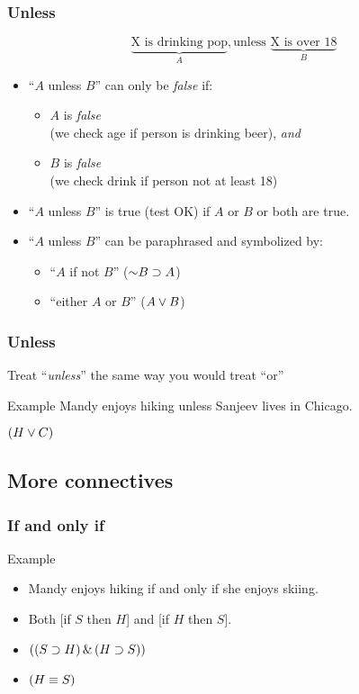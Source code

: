 \begin{frame}
\frametitle{Unless}

\[\underbrace{\text{X is drinking pop}}_{A},
\text{unless\ }\underbrace{\text{X is over 18}}_{B}\]

\begin{itemize}[<+->]
\item ``$A$ unless $B$'' can only be \emph{false} if:
\begin{itemize}
\item $A$ is \emph{false}\\
(we check age if person is drinking beer), \emph{and}
\item $B$ is \emph{false}\\
(we check drink if person not at least 18)
\end{itemize}
\item ``$A$ unless $B$'' is true (test OK) if
$A$ or $B$ or both are true.
\item ``$A$ unless $B$'' can be paraphrased and symbolized by:
\begin{itemize}
\item ``$A$ if not $B$'' ($\enot B \eif A$)
\item ``either $A$ or $B$'' ($A \vee B$)
\end{itemize}
\end{itemize}

\end{frame}

\begin{frame}
  \frametitle{Unless}

  Treat ``\emph{unless}'' the same way you would treat ``or''

  \begin{block}{Example}
  Mandy enjoys hiking unless Sanjeev lives in Chicago.

  $(H \vee C)$
  \end{block}
\end{frame}


\subsection{More connectives}

\begin{frame}
  \frametitle{If and only if}

  \begin{block}{Example}
    \begin{itemize}[<+->]
    \item[] Mandy enjoys hiking if and only if she enjoys skiing.
    \item[] Both [if $S$ then $H$] and [if $H$ then $S$].
    \item[] $((S \supset H)\,\&\,(H \supset S))$
    \item[] $(H \equiv S)$
    \end{itemize}
  \end{block}

\end{frame}

